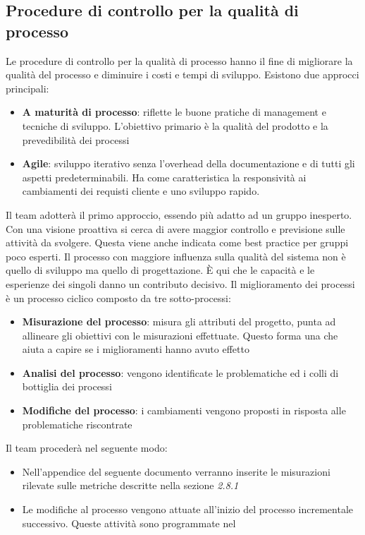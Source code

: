 {  \subsection{Procedure di controllo per la qualità di processo}
  Le procedure di controllo per la qualità di processo hanno il fine di migliorare la qualità del
  processo e diminuire i costi e tempi di sviluppo. Esistono due
  approcci principali:
  \begin{itemize}
  \item \textbf{A maturità di processo}: riflette le buone pratiche di management e tecniche di sviluppo.
    L'obiettivo primario è la qualità del prodotto e la prevedibilità dei processi
  \item \textbf{Agile}: sviluppo iterativo senza l’overhead della
    documentazione e di tutti gli aspetti predeterminabili. Ha come
    caratteristica la responsività ai cambiamenti dei requisti cliente e
    uno sviluppo rapido.
  \end{itemize}
  Il team adotterà il primo approccio, essendo più adatto ad un gruppo inesperto. Con una visione
  proattiva si cerca di avere maggior controllo e previsione sulle attività da svolgere. Questa viene
  anche indicata come best practice per gruppi poco esperti.
  Il processo con maggiore influenza sulla qualità del sistema non è quello di sviluppo ma quello
  di progettazione. È qui che le capacità e le esperienze dei singoli danno un contributo decisivo.
  Il miglioramento dei processi è un processo ciclico composto da tre
  sotto-processi:

  \begin{itemize}
  \item \textbf{Misurazione del processo}: misura gli attributi del progetto, punta ad allineare gli
    obiettivi con le misurazioni effettuate. Questo forma una  che aiuta a capire se i
    miglioramenti hanno avuto effetto
  \item \textbf{Analisi del processo}: vengono identificate le problematiche ed i colli di bottiglia dei
    processi
  \item \textbf{Modifiche del processo}: i cambiamenti vengono proposti in risposta alle problematiche
    riscontrate
  \end{itemize}
  Il team procederà nel seguente modo:
  \begin{itemize}
  \item Nell'appendice del seguente documento verranno inserite le misurazioni
    rilevate sulle metriche descritte nella sezione \emph{2.8.1}
  \item Le modifiche al processo vengono attuate all’inizio del processo incrementale successivo.
    Queste attività sono programmate nel  \emph{\pianodiprogetto}
  \end{itemize}

}
